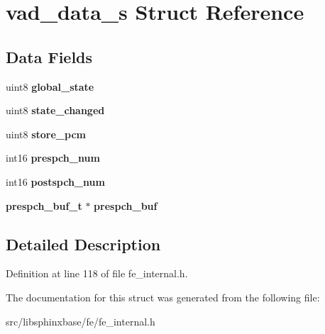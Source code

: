 \section{vad\+\_\+data\+\_\+s Struct Reference}
\label{structvad__data__s}
\subsection*{Data Fields}
\begin{DoxyCompactItemize}
\item 
uint8 {\bfseries global\+\_\+state}\label{structvad__data__s_ac320029ecef22bd8856e7d12b10f3219}

\item 
uint8 {\bfseries state\+\_\+changed}\label{structvad__data__s_a3b62819ebfc3c5d06284d69b1604c289}

\item 
uint8 {\bfseries store\+\_\+pcm}\label{structvad__data__s_acfbbce04315dd3b9d3a109c76cd86e81}

\item 
int16 {\bfseries prespch\+\_\+num}\label{structvad__data__s_a6e7e7794d61eb74155058da0b9f40d78}

\item 
int16 {\bfseries postspch\+\_\+num}\label{structvad__data__s_abb3bf6c510b83b30056100fe4d281a49}

\item 
{\bf prespch\+\_\+buf\+\_\+t} $\ast$ {\bfseries prespch\+\_\+buf}\label{structvad__data__s_a940abb6ae872a35dc8a7f405e5e7a6a6}

\end{DoxyCompactItemize}


\subsection{Detailed Description}


Definition at line 118 of file fe\+\_\+internal.\+h.



The documentation for this struct was generated from the following file\+:\begin{DoxyCompactItemize}
\item 
src/libsphinxbase/fe/fe\+\_\+internal.\+h\end{DoxyCompactItemize}
